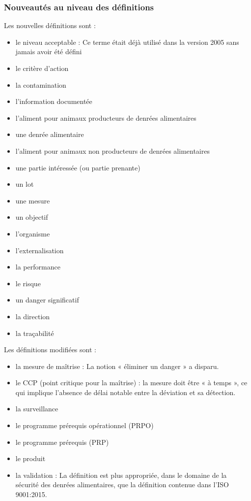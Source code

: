\begin{spacing}{1.2}
\subsubsection{Nouveautés au niveau des définitions}
Les nouvelles définitions sont :


\begin{itemize}
	\item  le niveau acceptable : Ce terme était déjà utilisé dans la version 2005 sans jamais  avoir été défini
	\item  le critère d’action
	\item  la contamination
	\item  l’information documentée
	\item  l’aliment pour animaux producteurs de denrées alimentaires
	\item  une denrée alimentaire
	\item  l’aliment pour animaux non producteurs de denrées alimentaires
	\item  une partie intéressée (ou partie prenante)
	\item  un lot
	\item  une mesure
	\item  un objectif
	\item  l’organisme
	\item  l’externalisation
	\item  la performance
	\item  le risque
	\item  un danger significatif
	\item  la direction
	\item  la traçabilité
\end{itemize}



Les définitions modifiées sont :


\begin{itemize}
	\item  la mesure de maîtrise : La notion « éliminer un danger » a disparu.
	\item  le CCP (point critique pour la maîtrise) : la mesure doit être « à temps », ce qui implique l’absence de délai notable entre la déviation et sa détection.
	\item la surveillance
	\item  le programme prérequis opérationnel (PRPO)
	\item  le programme prérequis (PRP)
	\item  le produit
	\item  la validation : La définition est plus appropriée, dans le domaine de la sécurité des denrées alimentaires, que la définition contenue dans l’ISO 9001:2015.
\end{itemize}


\end{spacing}
